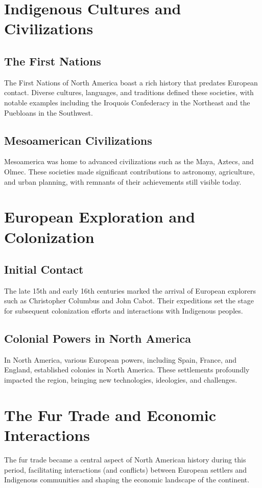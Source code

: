 \documentclass[a4paper,12pt]{book}
\begin{document}
\section{Indigenous Cultures and Civilizations}
\label{sec:indigenous-cultures}

\subsection{The First Nations}
The First Nations of North America boast a rich history that predates European contact. Diverse cultures, languages, and traditions defined these societies, with notable examples including the Iroquois Confederacy in the Northeast and the Puebloans in the Southwest.

\subsection{Mesoamerican Civilizations}
Mesoamerica was home to advanced civilizations such as the Maya, Aztecs, and Olmec. These societies made significant contributions to astronomy, agriculture, and urban planning, with remnants of their achievements still visible today.

\section{European Exploration and Colonization}
\label{sec:european-exploration-colonization}

\subsection{Initial Contact}
The late 15th and early 16th centuries marked the arrival of European explorers such as Christopher Columbus and John Cabot. Their expeditions set the stage for subsequent colonization efforts and interactions with Indigenous peoples.

\subsection{Colonial Powers in North America}
In North America, various European powers, including Spain, France, and England, established colonies in North America. These settlements profoundly impacted the region, bringing new technologies, ideologies, and challenges.

\section{The Fur Trade and Economic Interactions}
\label{sec:fur-trade-economic-interactions}
The fur trade became a central aspect of North American history during this period, facilitating interactions (and conflicts) between European settlers and Indigenous communities and shaping the economic landscape of the continent.
\end{document}
